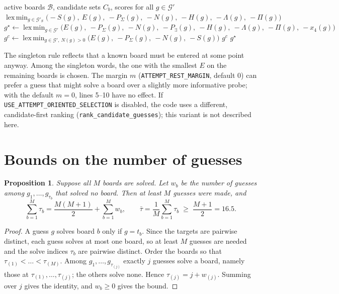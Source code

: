 \documentclass[11pt,a4paper]{article}
\newtheorem{proposition}{Proposition}
\theoremstyle{definition}
\theoremstyle{remark}
\newcommand{\G}{\mathcal{G}}
\newcommand{\B}{\mathcal{B}}
\DeclareMathOperator*{\lexmin}{lex\,min}
\begin{document}
\begin{algorithm}[H]
\caption{Choice of the next guess}
\begin{algorithmic}[1]
\Require active boards $\B$, candidate sets $C_b$, scores for all $g \in \G'$
\If{some $b \in \B$ has $|C_b| = 1$ \textbf{and} $\G'_S = \{ g \in \G' : S(g) > 0 \} \neq \emptyset$}
  \State \Return $\displaystyle \lexmin_{g \in \G'_S}
     \bigl(-S(g),\ E(g),\ -P_\Sigma(g),\ -N(g),\ -H(g),\ -\Lambda(g),\ -\Pi(g)\bigr)$
\EndIf
\State $g^\star \gets \displaystyle \lexmin_{g \in \G'}
   \bigl(E(g),\ -P_\Sigma(g),\ -N(g),\ -P_\exists(g),\ -H(g),\ -\Lambda(g),\ -\Pi(g),\ -x_4(g)\bigr)$
  \State $g^c \gets \displaystyle \lexmin_{g \in \G',\ N(g) > 0}
     \bigl(E(g),\ -P_\Sigma(g),\ -N(g),\ -S(g)\bigr)$
   \State \Return $g^c$ \EndIf
\EndIf
\State \Return $g^\star$
\end{algorithmic}
\end{algorithm}

The singleton rule reflects that a known board must be entered at some point anyway.
Among the singleton words, the one with the smallest $E$ on the remaining boards is chosen.
The margin $m$ (\texttt{ATTEMPT\_REST\_MARGIN}, default $0$) can prefer a guess that
might solve a board over a slightly more informative probe; with the default $m = 0$,
lines 5--10 have no effect.
If \texttt{USE\_ATTEMPT\_ORIENTED\_SELECTION} is disabled, the code uses a different,
candidate-first ranking (\texttt{rank\_candidate\_guesses}); this variant is not described here.

\section{Bounds on the number of guesses}

\begin{proposition}
\label{prop:bound}
Suppose all $M$ boards are solved. Let $w_b$ be the number of guesses among
$g_1,\dots,g_{\tau_b}$ that solved no board. Then at least $M$ guesses were made, and
\[
  \sum_{b=1}^{M} \tau_b = \frac{M(M+1)}{2} + \sum_{b=1}^{M} w_b,
  \qquad
  \bar\tau = \frac{1}{M}\sum_{b=1}^{M} \tau_b \;\ge\; \frac{M+1}{2} = 16.5 .
\]
\end{proposition}

\begin{proof}
A guess $g$ solves board $b$ only if $g = t_b$. Since the targets are pairwise
distinct, each guess solves at most one board, so at least $M$ guesses are needed and the
solve indices $\tau_b$ are pairwise distinct. Order the boards so that
$\tau_{(1)} < \dots < \tau_{(M)}$. Among $g_1,\dots,g_{\tau_{(j)}}$ exactly $j$ guesses
solve a board, namely those at $\tau_{(1)},\dots,\tau_{(j)}$; the others solve none.
Hence $\tau_{(j)} = j + w_{(j)}$. Summing over $j$ gives the identity, and $w_b \ge 0$
gives the bound.
\end{proof}
\end{document}
